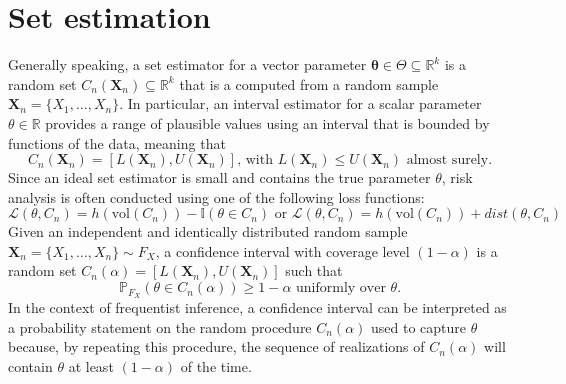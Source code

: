 \documentclass{report}
\begin{document}
\section{Set estimation}
Generally speaking, a set estimator for a vector parameter $\displaystyle \mathbf{\theta} \in \Theta \subseteq \mathbb{R}^k$ is a random set $\displaystyle C_n(\mathbf{X}_n) \subseteq \mathbb{R}^k$ that is a computed from a random sample $\displaystyle \mathbf{X}_n = \{X_1, \dots, X_n\}$. \newline
In particular, an interval estimator for a scalar parameter $\displaystyle \theta \in \mathbb{R}$ provides a range of plausible values using an interval that is bounded by functions of the data, meaning that
\[C_n(\mathbf{X}_n) = [L(\mathbf{X}_n), U(\mathbf{X}_n)] \text{, with $L(\mathbf{X}_n) \leq U(\mathbf{X}_n)$ almost surely.}\]
Since an ideal set estimator is small and contains the true parameter $\displaystyle \theta$, risk analysis is often conducted using one of the following loss functions:
\[\mathcal{L}(\theta, C_n) = h(\text{vol}(C_n)) - \mathbb{I}(\theta \in C_n) \text{ or } \mathcal{L}(\theta, C_n) = h(\text{vol}(C_n)) + dist(\theta, C_n)\]
Given an independent and identically distributed random sample $\displaystyle \mathbf{X}_n = \{X_1, \dots, X_n\} \sim F_X$, a confidence interval with coverage level $\displaystyle (1 - \alpha)$ is a random set $\displaystyle C_n(\alpha) = [L(\mathbf{X}_n), U(\mathbf{X}_n)]$ such that
\[\mathbb{P}_{F_X}(\theta \in C_n(\alpha)) \ge 1 - \alpha \text{ uniformly over $\theta$.}\]
In the context of frequentist inference, a confidence interval can be interpreted as a probability statement on the random procedure $\displaystyle C_n(\alpha)$ used to capture $\displaystyle \theta$ because, by repeating this procedure, the sequence of realizations of $\displaystyle C_n(\alpha)$ will contain $\displaystyle \theta$ at least $\displaystyle (1 - \alpha)$ of the time.
\end{document}
